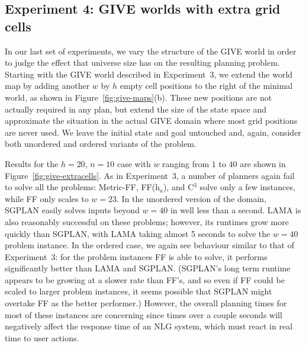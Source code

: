 \subsection{Experiment 4: GIVE worlds with extra grid cells}
\label{sec:experiment-4:-give}

In our last set of experiments, we vary the structure of the GIVE world in order
to judge the effect that universe size has on the resulting planning problem.
Starting with the GIVE world described in Experiment~3, we extend the world map
by adding another $w$ by $h$ empty cell positions to the right of the minimal
world, as shown in Figure~\ref{fig:give-maps}(b). These new positions are not
actually required in any plan, but extend the size of the state space and
approximate the situation in the actual GIVE domain where most grid positions
are never used. We leave the initial state and goal untouched and, again,
consider both unordered and ordered variants of the problem.

Results for the $h=20$, $n=10$ case with $w$ ranging from $1$ to $40$ are shown
in Figure~\ref{fig:give-extracells}. As in Experiment~3, a number of planners
again fail to solve all the problems: Metric-FF, FF(h$_a$), and C$^3$ solve only
a few instances, while FF only scales to $w=23$. In the unordered version of the
domain, SGPLAN easily solves inputs beyond $w=40$ in well less than a second.
LAMA is also reasonably successful on these problems; however, its runtimes grow
more quickly than SGPLAN, with LAMA taking almost 5 seconds to solve the $w=40$
problem instance. In the ordered case, we again see behaviour similar to that of
Experiment~3: for the problem instances FF is able to solve, it performs
significantly better than LAMA and SGPLAN. (SGPLAN's long term runtime
appears to be growing at a slower rate than FF's, and so even if FF could be
scaled to larger problem instances, it seems possible that SGPLAN might overtake
FF as the better performer.) However, the overall planning times for most of
these instances are concerning since times over a couple seconds will negatively
affect the response time of an NLG system, which must react in real time to user
actions.

